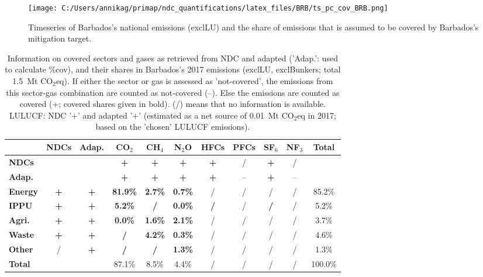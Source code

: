 \documentclass[12pt]{article}
\begin{document}
 \begin{figure}[H]
 \centering
 \texttt{[image: C:/Users/annikag/primap/ndc\_quantifications/latex\_files/BRB/ts\_pc\_cov\_BRB.png]}
 \caption{Timeseries of Barbados's national emissions (exclLU) and the share of emissions that is assumed to be covered by Barbados's mitigation target.}
 \label{fig:tsPcCov}
 \end{figure}

 \begin{table}[H]\small
 \centering
 \caption{Information on covered sectors and gases as retrieved from NDC and adapted ('Adap.': used to calculate \%cov), and their shares in Barbados's 2017 emissions (exclLU, exclBunkers; total 1.5~Mt CO$_2$eq).
 If either the sector or gas is assessed as 'not-covered', the emissions from this sector-gas combination are counted as not-covered (--). 
 Else the emissions are counted as covered (+; covered shares given in bold).
 (/) means that no information is available.
 LULUCF: NDC '+' and adapted '+' (estimated as a net source of 0.01~Mt CO$_2$eq in 2017; based on the 'chosen' LULUCF emissions).}
 \label{tab:coveredSectorsGases}
 \begin{tabular}{l || c c || c c c c c c c | c}
 \bfseries  & \bfseries NDCs & \bfseries Adap. & \bfseries CO$_2$ & \bfseries CH$_4$ & \bfseries N$_2$O & \bfseries HFCs & \bfseries PFCs & \bfseries SF$_6$ & \bfseries NF$_3$ & \bfseries Total \tabularnewline \hline \hline
 \bfseries NDCs &  &  & \bfseries + & \bfseries + & \bfseries + & \bfseries + & / & \bfseries + & / &  \tabularnewline 
 \bfseries Adap. &  &  & \bfseries + & \bfseries + & \bfseries + & \bfseries + & -- & \bfseries + & -- &  \tabularnewline \hline \hline
 \bfseries Energy & \bfseries + & \bfseries + & \bfseries 81.9\% & \bfseries 2.7\% & \bfseries 0.7\% & / & / & / & / & 85.2\% \tabularnewline 
 \bfseries IPPU & \bfseries + & \bfseries + & \bfseries 5.2\% & \bfseries / & \bfseries 0.0\% & \bfseries / & / & \bfseries / & / & 5.2\% \tabularnewline 
 \bfseries Agri. & \bfseries + & \bfseries + & \bfseries 0.0\% & \bfseries 1.6\% & \bfseries 2.1\% & / & / & / & / & 3.7\% \tabularnewline 
 \bfseries Waste & \bfseries + & \bfseries + & \bfseries / & \bfseries 4.2\% & \bfseries 0.3\% & / & / & / & / & 4.6\% \tabularnewline 
 \bfseries Other & / & \bfseries + & \bfseries / & \bfseries / & \bfseries 1.3\% & / & / & / & / & 1.3\% \tabularnewline \hline
 \bfseries Total &  &  & 87.1\% & 8.5\% & 4.4\% & / & / & / & / & 100.0\% \tabularnewline 
 \end{tabular}
 \end{table}
\end{document}
